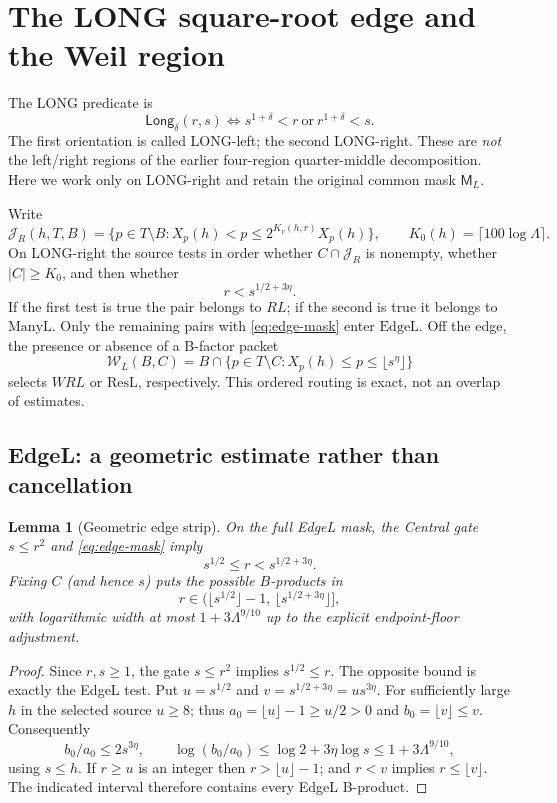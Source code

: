 \documentclass[11pt]{article}
\newcommand{\Lam}{\Lambda}
\newcommand{\MR}{\mathsf M}
\newcommand{\JR}{\mathcal J_R}
\newtheorem{lemma}[theorem]{Lemma}
\theoremstyle{definition}
\theoremstyle{remark}
\newcommand{\1}{\mathbf 1}
\begin{document}
\section{The LONG square-root edge and the Weil region}\label{sec:edge}

The LONG predicate is
\[
 \mathsf{Long}_{\delta}(r,s)\iff
 s^{1+\delta}<r\ \text{or}\ r^{1+\delta}<s.
\]
The first orientation is called LONG-left; the second LONG-right.
These are \emph{not} the left/right regions of the earlier
four-region quarter-middle decomposition. Here we work only on
LONG-right and retain the original common mask $\MR_L$.

Write
\begin{equation}\label{eq:jr-def}
 \JR(h,T,B)=\{p\in T\setminus B:
 X_p(h)<p\le 2^{K_v(h,r)}X_p(h)\},
\qquad K_0(h)=\lceil100\log\Lam\rceil.
\end{equation}
On LONG-right the source tests in order whether $C\cap\JR$
is nonempty, whether $|C|\ge K_0$, and then whether
\begin{equation}\label{eq:edge-mask}
 r<s^{1/2+3\eta}.
\end{equation}
If the first test is true the pair belongs to $RL$; if the
second is true it belongs to $\mathrm{ManyL}$. Only the
remaining pairs with \eqref{eq:edge-mask} enter $\mathrm{EdgeL}$.
Off the edge, the presence or absence of a B-factor packet
\[
 \mathcal W_L(B,C)=
 B\cap\{p\in T\setminus C:X_p(h)\le p\le\lfloor s^\eta\rfloor\}
\]
selects $WRL$ or $\mathrm{ResL}$, respectively. This ordered
routing is exact, not an overlap of estimates.

\subsection{EdgeL: a geometric estimate rather than cancellation}

\begin{lemma}[Geometric edge strip]\label{lem:edge-strip}
On the full EdgeL mask, the Central gate $s\le r^2$ and
\eqref{eq:edge-mask} imply
\begin{equation}\label{appendix:eq:edge-strip}
 s^{1/2}\le r<s^{1/2+3\eta}.
\end{equation}
Fixing $C$ (and hence $s$) puts the possible $B$-products in
\[
 r\in\bigl(\lfloor s^{1/2}\rfloor-1,\,
                   \lfloor s^{1/2+3\eta}\rfloor\bigr],
\]
with logarithmic width at most $1+3\Lam^{9/10}$
up to the explicit endpoint-floor adjustment.
\end{lemma}
\begin{proof}
Since $r,s\ge1$, the gate $s\le r^2$ implies
$s^{1/2}\le r$. The opposite bound is exactly the EdgeL
test. Put $u=s^{1/2}$ and $v=s^{1/2+3\eta}=u s^{3\eta}$.
For sufficiently large $h$ in the selected source $u\ge8$;
thus $a_0=\lfloor u\rfloor-1\ge u/2>0$ and
$b_0=\lfloor v\rfloor\le v$. Consequently
\[
 b_0/a_0\le2s^{3\eta},\qquad
 \log(b_0/a_0)\le\log2+3\eta\log s
 \le1+3\Lam^{9/10},
\]
using $s\le h$. If $r\ge u$ is an integer then
$r>\lfloor u\rfloor-1$; and $r<v$ implies
$r\le\lfloor v\rfloor$. The indicated interval therefore
contains every EdgeL B-product.
\end{proof}
\end{document}
